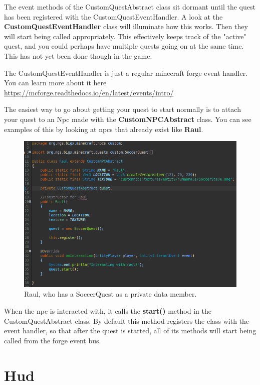 \documentclass[12pt]{article}
\begin{document}
The event methods of the CustomQuestAbstract class sit dormant until the quest has been registered with the CustomQuestEventHandler. A look at the {\bfseries CustomQuestEventHandler} class will illuminate how this works. Then they will start being called appropriately. This effectively keeps track of the "active" quest, and you could perhaps have multiple quests going on at the same time. This has not yet been done though in the game.

The CustomQuestEventHandler is just a regular minecraft forge event handler. You can learn more about it here \url{https://mcforge.readthedocs.io/en/latest/events/intro/}

The easiest way to go about getting your quest to start normally is to attach your quest to an Npc made with the {\bfseries CustomNPCAbstract} class. You can see examples of this by looking at npcs that already exist like {\bfseries Raul}.

\begin{figure}[H]
	\caption{Raul, who has a SoccerQuest as a private data member.}
	\includegraphics[scale=0.3]{images/quests/RaulQuest.png}
	\centering
\end{figure}

When the npc is interacted with, it calls the {\bfseries start()} method in the CustomQuestAbstract class. By default this method registers the class with the event handler, so that after the quest is started, all of its methods will start being called from the forge event bus.


\section{Hud}
\label{sec:hud}
\end{document}
